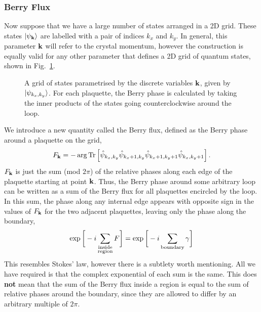 \subsubsection{Berry Flux}

Now suppose that we have a large number of states arranged in a 2D grid. These states  $\ket{\psi_{\textbf k}}$ are labelled with a pair of indices $k_x$ and $k_y$. In general, this parameter $\textbf k$ will refer to the crystal momentum, however the construction is equally valid for any other parameter that defines a 2D grid of quantum states, shown in Fig.~\ref{fig:berry_grid}.

\begin{figure}
    \begin{center}
        
    \caption[A grid of states parametrised by a discrete parameter. ]{A grid of states parametrised by the discrete variables $\textbf k$, given by $\ket{\psi_{k_x,k_y}}$. For each plaquette, the Berry phase is calculated by taking the inner products of the states going counterclockwise around the loop.}
    \label{fig:berry_grid}
    \end{center}
\end{figure}%

We introduce a new quantity called the Berry flux, defined as the Berry phase around a plaquette on the grid,
\begin{align}\label{eqn:berry_flux}
    F_{\textbf k} =  
    - \arg \textup{Tr} \left [ 
        \hat \psi_{k_x,k_y}
        \hat \psi_{k_x+1,k_y}
        \hat \psi_{k_x+1,k_y+1}
        \hat \psi_{k_x,k_y+1} 
        \right ].
\end{align}
$F_{\textbf k}$ is just the sum (mod $2\pi$) of the relative phases along each edge of the plaquette starting at point $\textbf k$. Thus, the Berry phase around some arbitrary loop can be written as a sum of the Berry flux for all plaquettes encircled by the loop. In this sum, the phase along any internal edge appears with opposite sign in the values of $F_{\textbf k}$ for the two adjacent plaquettes, leaving only the phase along the boundary,
\begin{align} \label{eqn:berry_sum_discrete}
    \exp 
    \bigg [
        -i \sum_{\substack{\textup{inside} \\ \textup{region}}}F
    \bigg ] 
    = \exp \bigg [ 
        -i\sum_{\textup{boundary}} \gamma
    \bigg ]
\end{align}
This resembles Stokes' law, however there is a subtlety worth mentioning. All we have required is that the complex exponential of each sum is the same. This does \textbf{not} mean that the sum of the Berry flux inside a region is equal to the sum of relative phases around the boundary, since they are allowed to differ by an arbitrary multiple of $2\pi$.


